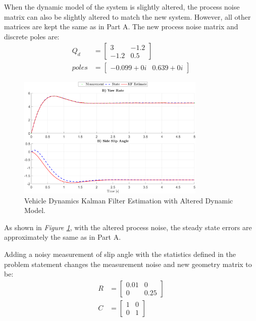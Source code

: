 \documentclass[10pt]{article}
\begin{document}
\begin{enumerate}[label=\textbf{\arabic*.}]
  When the dynamic model of the system is slightly altered, the process noise 
  matrix can also be slightly altered to match the new system. However, all 
  other matrices are kept the same as in Part A. The new process noise matrix 
  and discrete poles are:
  \begin{equation*}
    \begin{split}
      Q_d &= \begin{bmatrix} 3 & -1.2 \\ -1.2 & 0.5 \end{bmatrix} \\
      poles &= \begin{bmatrix} -0.099+0i & 0.639+0i \end{bmatrix}
    \end{split}
  \end{equation*}
  \begin{figure}[H]
    \centering
    \includegraphics[width=0.8\textwidth]{p4_b.png}
    \caption{Vehicle Dynamics Kalman Filter Estimation with Altered Dynamic Model.}
    \label{f:4.2}
  \end{figure}
  As shown in \emph{Figure \ref{f:4.2}}, with the altered process noise, the 
  steady state errors are approximately the same as in Part A.

  Adding a noisy measurement of slip angle with the statistics defined in the 
  problem statement changes the measurement noise and new geometry matrix to be:
  \begin{equation*}
    \begin{split}
      R &= \begin{bmatrix} 0.01 & 0 \\ 0 & 0.25 \end{bmatrix} \\
      C &= \begin{bmatrix} 1 & 0 \\ 0 & 1 \end{bmatrix} \\
    \end{split}
  \end{equation*}


\end{enumerate}
\end{document}
